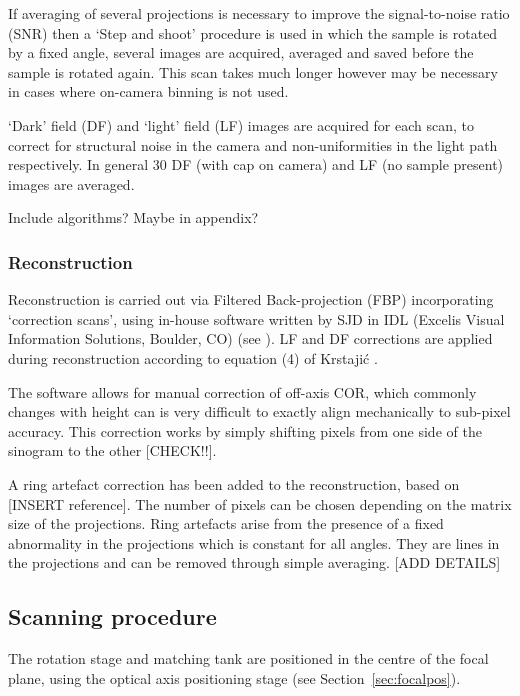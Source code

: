 If averaging of several projections is necessary to improve the signal-to-noise ratio (SNR) then a `Step and shoot' procedure is used in which the sample is rotated by a fixed angle, several images are acquired, averaged and saved before the sample is rotated again. This scan takes much longer however may be necessary in cases where on-camera binning is not used. 


`Dark' field (DF) and `light' field (LF) images are acquired for each scan, to correct for structural noise in the camera and non-uniformities in the light path respectively. In general 30 DF (with cap on camera) and LF (no sample present) images are averaged. 




Include algorithms? Maybe in appendix?

\subsubsection{Reconstruction}
Reconstruction is carried out via Filtered Back-projection (FBP) incorporating  `correction scans', using in-house software  written by  SJD in IDL (Excelis Visual Information Solutions, Boulder, CO) (see \cite{doranestablishing2013}). LF and DF corrections are applied during reconstruction according to  equation (4) of Krstaji\'{c} \cite{Krstajic:2007ec}.  


The software  allows for manual correction of off-axis COR, which commonly changes with height can is very difficult to exactly align mechanically to sub-pixel accuracy. This correction works by simply shifting pixels from one side of the sinogram to the other [CHECK!!]. 

A ring artefact correction has been added to the reconstruction, based on [INSERT reference]. The number of pixels can be chosen depending on the matrix size of the projections. Ring artefacts arise from the presence of a fixed abnormality in the projections which is constant for all angles. They are lines in the projections and can be removed through simple averaging. [ADD DETAILS]


\subsection{Scanning procedure}

The rotation stage and matching tank are positioned in the centre of the focal plane, using the optical axis positioning stage (see Section~\ref{sec:focalpos}).

